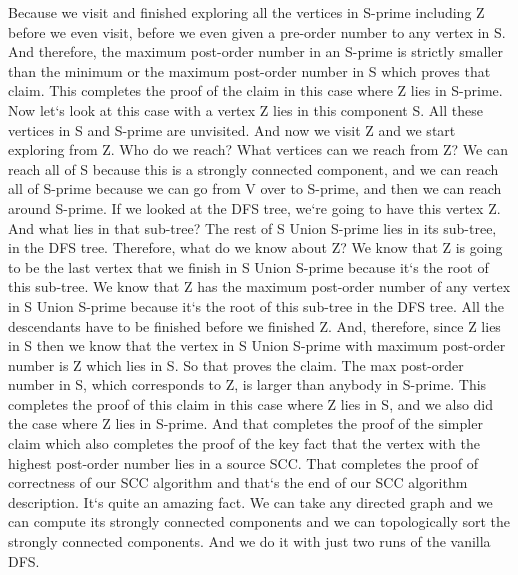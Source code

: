 Because we visit and finished exploring all the vertices in S-prime including Z before we even visit, before we even given a pre-order number to any vertex in S\@.
And therefore, the maximum post-order number in an S-prime is strictly smaller than the minimum or the maximum post-order number in S which proves that claim.
This completes the proof of the claim in this case where Z lies in S-prime.
Now let`s look at this case with a vertex Z lies in this component S\@.
All these vertices in S and S-prime are unvisited.
And now we visit Z and we start exploring from Z\@.
Who do we reach? What vertices can we reach from Z? We can reach all of S because this is a strongly connected component, and we can reach all of S-prime because we can go from V over to S-prime, and then we can reach around S-prime.
If we looked at the DFS tree, we`re going to have this vertex Z\@.
And what lies in that sub-tree? The rest of S Union S-prime lies in its sub-tree, in the DFS tree.
Therefore, what do we know about Z? We know that Z is going to be the last vertex that we finish in S Union S-prime because it`s the root of this sub-tree.
We know that Z has the maximum post-order number of any vertex in S Union S-prime because it`s the root of this sub-tree in the DFS tree.
All the descendants have to be finished before we finished Z\@.
And, therefore, since Z lies in S then we know that the vertex in S Union S-prime with maximum post-order number is Z which lies in S\@.
So that proves the claim.
The max post-order number in S, which corresponds to Z, is larger than anybody in S-prime.
This completes the proof of this claim in this case where Z lies in S, and we also did the case where Z lies in S-prime.
And that completes the proof of the simpler claim which also completes the proof of the key fact that the vertex with the highest post-order number lies in a source SCC\@.
That completes the proof of correctness of our SCC algorithm and that`s the end of our SCC algorithm description.
It`s quite an amazing fact.
We can take any directed graph and we can compute its strongly connected components and we can topologically sort the strongly connected components.
And we do it with just two runs of the vanilla DFS\@.

